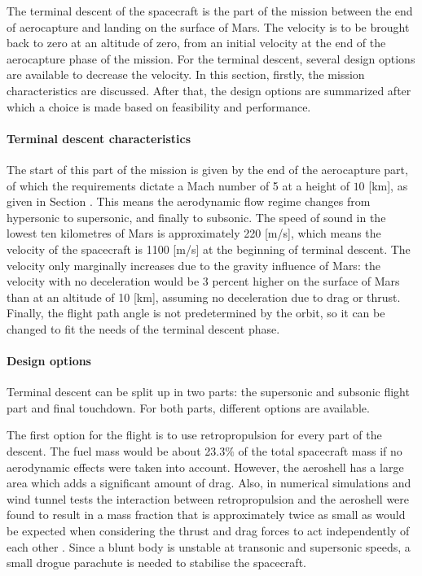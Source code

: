 The terminal descent of the spacecraft is the part of the mission between the end of aerocapture and landing on the surface of Mars. The velocity is to be brought back to zero at an altitude of zero, from an initial velocity at the end of the aerocapture phase of the mission. For the terminal descent, several design options are available to decrease the velocity. In this section, firstly, the mission characteristics are discussed. After that, the design options are summarized after which a choice is made based on feasibility and performance.

\paragraph{Terminal descent characteristics}
The start of this part of the mission is given by the end of the aerocapture part, of which the requirements dictate a Mach number of 5 at a height of $10$ [km], as given in Section \label{sec:missionreq}. This means the aerodynamic flow regime changes from hypersonic to supersonic, and finally to subsonic. The speed of sound in the lowest ten kilometres of Mars is approximately 220 [m/s], which means the velocity of the spacecraft is 1100 [m/s] at the beginning of terminal descent. The velocity only marginally increases due to the gravity influence of Mars: the velocity with no deceleration would be 3 percent higher on the surface of Mars than at an altitude of 10 [km], assuming no deceleration due to drag or thrust. Finally, the flight path angle is not predetermined by the orbit, so it can be changed to fit the needs of the terminal descent phase.

\paragraph{Design options}
Terminal descent can be split up in two parts: the supersonic and subsonic flight part and final touchdown. For both parts, different options are available.

The first option for the flight is to use retropropulsion for every part of the descent. The fuel mass would be about 23.3$\%$ of the total spacecraft mass if no aerodynamic effects were taken into account. However, the aeroshell has a large area which adds a significant amount of drag. Also, in numerical simulations and wind tunnel tests the interaction between retropropulsion and the aeroshell were found to result in a mass fraction that is approximately twice as small as would be expected when considering the thrust and drag forces to act independently of each other \cite{Korzun2009}. Since a blunt body is unstable at transonic and supersonic speeds, a small drogue parachute is needed to stabilise the spacecraft.

